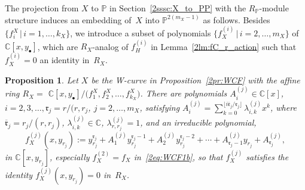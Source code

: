 \documentclass[10pt,a4paper]{amsart}
\def\CC{{\mathbb C}}
\def\PP{{\mathbb P}}
\def\fr{{\mathfrak r}}
\def\Bfr{{\overline{\mathfrak r}}}
\numberwithin{equation}{section}
\newtheorem{Proposition}[Theorem]{Proposition}
 { \theoremstyle{definition}
\newtheorem{Definition}[Theorem]{Definition}
\newtheorem{Note}[Theorem]{Note}
\newtheorem{Example}[Theorem]{Example}
\newtheorem{Remark}[Theorem]{Remark} }
\begin{document}
The projection from $X$ to $\PP$ in Section~\ref{2sssc:X_to_PP} with the $R_\PP$-module structure induces an embedding of~$X$ into $\PP^{2(m_X-1)}$ as follows.
Besides $\big\{f^X_i\, |\,i =1, \dots, k_X\big\}$, we introduce a subset of polynomials $\big\{f_X^{(i)} \, | \, i = 2, \dots, m_X\big\}$ of $\CC[x,y_\bullet]$, which are $R_X$-analog of $f_H^{(i)}$ in Lemma~\ref{2lm:fC_r_action} such that $f_X^{(i)}=0$ an identity in~$R_X$.

\begin{Proposition}\label{2pr:WCF2}
Let $X$ be the W-curve in Proposition~{\rm \ref{2pr:WCF}} with the affine ring $R_X=$\break
$\CC[x,y_{\bullet}]/\big(f^X_1, f^X_2, \dots, f^X_{k_X}\big)$.
There are polynomials $A^{(j)}_i\in \CC[x]$, $i=2, 3, \dots, \fr_j=r/(r,r_j$, $j=2, \dots, m_X$, satisfying $ A^{(j)}_i = \sum_{k=0}^{\lfloor i \Bfr_j/\fr_j\rfloor} \lambda^{(j)}_{i, k} x^k$, where $\Bfr_j = r_j/(r, r_j)$, $\lambda^{(j)}_{i,k} \in \CC$, $\lambda^{(j)}_{r,r_j}=1$, and an irreducible polynomial,
\begin{equation}
f^{(j)}_X(x,y_{r_j}):=y_{r_j}^{\fr_j} + A^{(j)}_{1} y_{r_j}^{\fr_j-1}
+ A^{(j)}_{2} y_{r_j}^{\fr_j-2}
+\cdots + A^{(j)}_{\fr_j-1} y_{r_j}
 + A^{(j)}_{\fr_j},
\label{2eq:WCF1b3}
\end{equation}
in $\CC[x,y_{r_j}]$, especially $f_X^{(2)}=f_X$ in~\eqref{2eq:WCF1b}, so that $f^{(j)}_X$ satisfies the identity $f^{(j)}_X(x,y_{r_j})=0$ in~$R_X$.
\end{Proposition}
\end{document}
